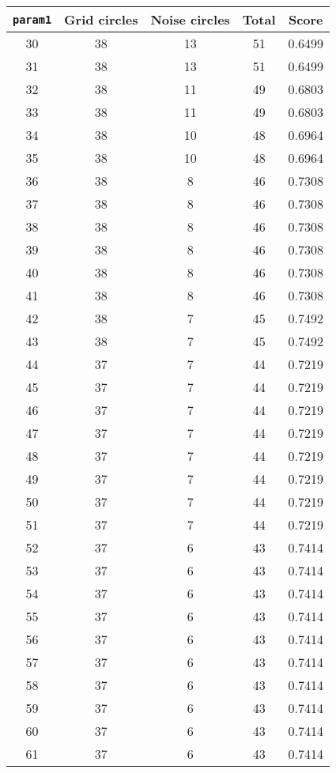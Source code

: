 \documentclass[letterpaper, 12pt]{article}
\begin{document}
\begin{longtable}{|c|c|c|c|c|}
\hline
\textbf{\texttt{param1}} & \textbf{Grid circles} & \textbf{Noise circles} & \textbf{Total} & \textbf{Score} \\
\hline
30 & 38 & 13 & 51 & 0.6499 \\
\hline
31 & 38 & 13 & 51 & 0.6499 \\
\hline
32 & 38 & 11 & 49 & 0.6803 \\
\hline
33 & 38 & 11 & 49 & 0.6803 \\
\hline
34 & 38 & 10 & 48 & 0.6964 \\
\hline
35 & 38 & 10 & 48 & 0.6964 \\
\hline
36 & 38 & 8 & 46 & 0.7308 \\
\hline
37 & 38 & 8 & 46 & 0.7308 \\
\hline
38 & 38 & 8 & 46 & 0.7308 \\
\hline
39 & 38 & 8 & 46 & 0.7308 \\
\hline
40 & 38 & 8 & 46 & 0.7308 \\
\hline
41 & 38 & 8 & 46 & 0.7308 \\
\hline
42 & 38 & 7 & 45 & 0.7492 \\
\hline
43 & 38 & 7 & 45 & 0.7492 \\
\hline
44 & 37 & 7 & 44 & 0.7219 \\
\hline
45 & 37 & 7 & 44 & 0.7219 \\
\hline
46 & 37 & 7 & 44 & 0.7219 \\
\hline
47 & 37 & 7 & 44 & 0.7219 \\
\hline
48 & 37 & 7 & 44 & 0.7219 \\
\hline
49 & 37 & 7 & 44 & 0.7219 \\
\hline
50 & 37 & 7 & 44 & 0.7219 \\
\hline
51 & 37 & 7 & 44 & 0.7219 \\
\hline
52 & 37 & 6 & 43 & 0.7414 \\
\hline
53 & 37 & 6 & 43 & 0.7414 \\
\hline
54 & 37 & 6 & 43 & 0.7414 \\
\hline
55 & 37 & 6 & 43 & 0.7414 \\
\hline
56 & 37 & 6 & 43 & 0.7414 \\
\hline
57 & 37 & 6 & 43 & 0.7414 \\
\hline
58 & 37 & 6 & 43 & 0.7414 \\
\hline
59 & 37 & 6 & 43 & 0.7414 \\
\hline
60 & 37 & 6 & 43 & 0.7414 \\
\hline
61 & 37 & 6 & 43 & 0.7414 \\

\end{longtable}
\end{document}
